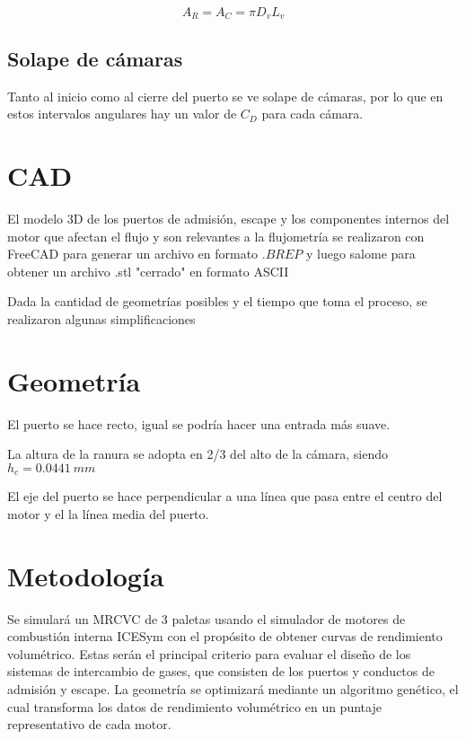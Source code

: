 $$ A_R = A_C = \pi D_v L_v $$

\subsection{Solape de cámaras}
%
Tanto al inicio como al cierre del puerto se ve solape de cámaras, por lo que
en estos intervalos angulares hay un valor de $C_D$ para cada cámara.

\section{CAD}
%
El modelo 3D de los puertos de admisión, escape y los componentes internos del
motor que afectan el flujo y son relevantes a la flujometría se realizaron con
FreeCAD\cite{freecad} para generar un archivo en formato $.BREP$ y luego
salome\cite{salome} para obtener un archivo .stl "cerrado" en formato ASCII

Dada la cantidad de geometrías posibles y el tiempo que toma el proceso, se
realizaron algunas simplificaciones

\section{Geometría}
%
El puerto se hace recto, igual se podría hacer una entrada más suave.

La altura de la ranura se adopta en 2/3 del alto de la cámara, siendo $h_c=0.0441\ mm$

El eje del puerto se hace perpendicular a una línea que pasa entre el centro
del motor y el la línea media del puerto.


\section{Metodología}
%
Se simulará un MRCVC de 3 paletas usando el simulador de motores de combustión
interna ICESym \cite{icesym} con el propósito de obtener curvas de rendimiento
volumétrico.
%
Estas serán el principal criterio para evaluar el diseño de los sistemas de
intercambio de gases, que consisten de los puertos y conductos de admisión y
escape.
%
La geometría se optimizará mediante un algoritmo genético, el cual transforma
los datos de rendimiento volumétrico en un puntaje representativo de cada
motor.


